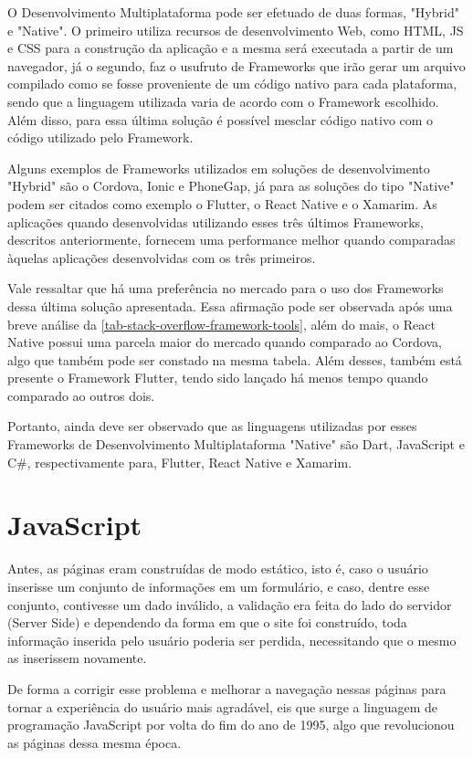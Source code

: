 O Desenvolvimento Multiplataforma pode ser efetuado de duas formas, "Hybrid" e "Native". O primeiro utiliza recursos de desenvolvimento Web, como HTML, JS e CSS para a construção da aplicação e a mesma será executada a partir de um navegador, já o segundo, faz o usufruto de Frameworks que irão gerar um arquivo compilado como se fosse proveniente de um código nativo para cada plataforma, sendo que a linguagem utilizada varia de acordo com o Framework escolhido. Além disso, para essa última solução é possível mesclar código nativo com o código utilizado pelo Framework.

Alguns exemplos de Frameworks utilizados em soluções de desenvolvimento "Hybrid" são o Cordova, Ionic e PhoneGap, já para as soluções do tipo "Native" podem ser citados como exemplo o Flutter, o React Native e o Xamarim. As aplicações quando desenvolvidas utilizando esses três últimos Frameworks, descritos anteriormente, fornecem uma performance melhor quando comparadas àquelas aplicações desenvolvidas com os três primeiros.

Vale ressaltar que há uma preferência no mercado para o uso dos Frameworks dessa última solução apresentada. Essa afirmação pode ser observada após uma breve análise da \autoref{tab-stack-overflow-framework-tools}, além do mais, o React Native possui uma parcela maior do mercado quando comparado ao Cordova, algo que também pode ser constado na mesma tabela. Além desses, também está presente o Framework Flutter, tendo sido lançado há menos tempo quando comparado ao outros dois.

Portanto, ainda deve ser observado que as linguagens utilizadas por esses Frameworks de Desenvolvimento Multiplataforma "Native" são Dart, JavaScript e C\#, respectivamente para, Flutter, React Native e Xamarim.

\section{JavaScript}\label{JavaScript}

Antes, as páginas eram construídas de modo estático, isto é, caso o usuário inserisse um conjunto de informações em um formulário, e caso, dentre esse conjunto, contivesse um dado inválido, a validação era feita do lado do servidor (Server Side) e dependendo da forma em que o site foi construído, toda informação inserida pelo usuário poderia ser perdida, necessitando que o mesmo as inserissem novamente.

De forma a corrigir esse problema e melhorar a navegação nessas páginas para tornar a experiência do usuário mais agradável, eis que surge a linguagem de programação JavaScript por volta do fim do ano de 1995, algo que revolucionou as páginas dessa mesma época.

